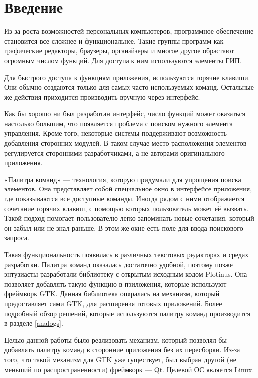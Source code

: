 \chapter*{Введение}

Из-за роста возможностей персональных компьютеров, программное обеспечение
становится все сложнее и функциональнее. Такие группы программ как графические
редакторы, браузеры, органайзеры и многое другое обрастают
огромным числом функций. Для доступа к ним используются элементы ГИП.

Для быстрого доступа к функциям приложения, используются горячие клавиши. Они
обычно создаются только для самых часто используемых команд. Остальные
же действия приходится производить вручную через интерфейс.

Как бы хорошо ни был разработан интерфейс, число функций может оказаться
настолько большим, что появляется проблема с поиском нужного элемента
управления. Кроме того, некоторые системы поддерживают возможность добавления
сторонних модулей. В таком случае место расположения элементов регулируется
сторонними разработчиками, а не авторами оригинального приложения.

«Палитра команд» — технология, которую придумали для упрощения поиска элементов.
Она представляет собой специальное окно в интерфейсе приложения, где
показываются все доступные команды. Иногда рядом с ними отображается
сочетание горячих клавиш, с помощью которых пользователь может её вызвать. Такой
подход помогает пользователю легко запоминать новые сочетания, который он забыл
или не знал раньше.  В этом же окне есть поле для ввода поискового запроса.

Такая функциональность появилась в различных текстовых редакторах и
средах разработки. Палитра команд оказалась достаточно удобной, поэтому позже
энтузиасты разработали библиотеку с открытым исходным кодом Plotinus. Она
позволяет добавлять такую функцию в приложения, которые используют фреймворк
GTK. Данная библиотека опиралась на механизм, который предоставляет сами GTK,
для расширения готовых приложений. Более подробный обзор решений,
которые используются палитру команд производится в разделе \ref{analogs}.

Целью данной работы было реализовать механизм, который позволял бы добавлять
палитру команд в сторонние приложения без их пересборки. Из-за того, что такой
механизм для GTK уже существует, был выбран другой (не меньший по
распространенности) фреймворк — Qt. Целевой ОС является Linux.

